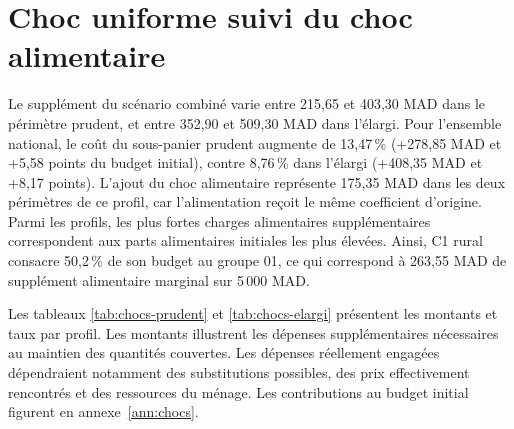 \section{Choc uniforme suivi du choc alimentaire}
Le supplément du scénario combiné varie entre 215,65 et 403,30 MAD dans le périmètre prudent, et entre 352,90 et 509,30 MAD dans l'élargi. Pour l'ensemble national, le coût du sous-panier prudent augmente de 13,47\,\% (+278,85 MAD et +5,58 points du budget initial), contre 8,76\,\% dans l'élargi (+408,35 MAD et +8,17 points). L'ajout du choc alimentaire représente 175,35 MAD dans les deux périmètres de ce profil, car l'alimentation reçoit le même coefficient d'origine. Parmi les profils, les plus fortes charges alimentaires supplémentaires correspondent aux parts alimentaires initiales les plus élevées. Ainsi, C1 rural consacre 50,2\,\% de son budget au groupe 01, ce qui correspond à 263,55 MAD de supplément alimentaire marginal sur 5\,000 MAD.

Les tableaux \ref{tab:chocs-prudent} et \ref{tab:chocs-elargi} présentent les montants et taux par profil. Les montants illustrent les dépenses supplémentaires nécessaires au maintien des quantités couvertes. Les dépenses réellement engagées dépendraient notamment des substitutions possibles, des prix effectivement rencontrés et des ressources du ménage.
Les contributions au budget initial figurent en annexe~\ref{ann:chocs}. 
\clearpage



\clearpage


